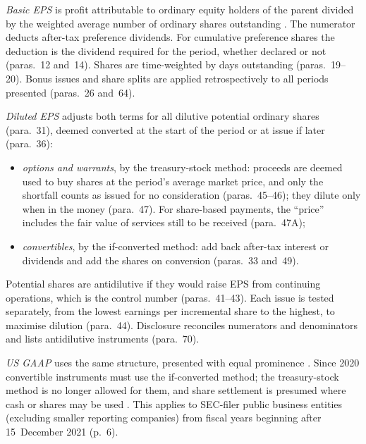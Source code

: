 \begin{qfmethod}\label{meth:earnings-per-share}
 \emph{Basic EPS} is profit attributable to ordinary equity holders of the parent divided by the weighted average number of ordinary shares outstanding \citep[IAS~33 para.~10]{eu-2023-1803-ias33}. The numerator deducts after-tax preference dividends. For cumulative preference shares the deduction is the dividend required for the period, whether declared or not (paras.~12 and~14). Shares are time-weighted by days outstanding (paras.~19--20). Bonus issues and share splits are applied retrospectively to all periods presented (paras.~26 and~64).

\emph{Diluted EPS} adjusts both terms for all dilutive potential ordinary shares (para.~31), deemed converted at the start of the period or at issue if later (para.~36):
\begin{itemize}
\item \emph{options and warrants}, by the treasury-stock method: proceeds are deemed used to buy shares at the period's average market price, and only the shortfall counts as issued for no consideration (paras.~45--46); they dilute only when in the money (para.~47). For share-based payments, the ``price'' includes the fair value of services still to be received (para.~47A);
\item \emph{convertibles}, by the if-converted method: add back after-tax interest or dividends and add the shares on conversion (paras.~33 and~49).
\end{itemize}
Potential shares are antidilutive if they would raise EPS from continuing operations, which is the control number (paras.~41--43). Each issue is tested separately, from the lowest earnings per incremental share to the highest, to maximise dilution (para.~44). Disclosure reconciles numerators and denominators and lists antidilutive instruments (para.~70).

\emph{US GAAP} uses the same structure, presented with equal prominence \citep[p.~374]{financial-statement-analysis-2009}. Since 2020 convertible instruments must use the if-converted method; the treasury-stock method is no longer allowed for them, and share settlement is presumed where cash or shares may be used \citep[pp.~5--6]{us-convertibles-eps-2020}. This applies to SEC-filer public business entities (excluding smaller reporting companies) from fiscal years beginning after 15~December 2021 (p.~6).


\end{qfmethod}
